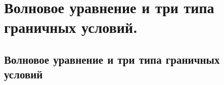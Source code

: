\chapter{Волновое уравнение и три типа граничных условий.}

\section{Волновое уравнение и три типа граничных условий}
\newpage
